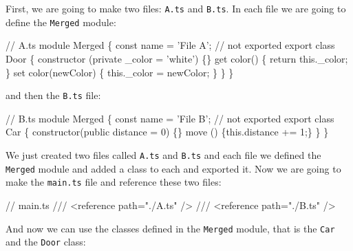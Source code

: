 \documentclass[12pt,]{article}
\newenvironment{Shaded}{}{}
\newcommand{\KeywordTok}[1]{\textcolor[rgb]{0.00,0.00,1.00}{{#1}}}
\newcommand{\DataTypeTok}[1]{{#1}}
\newcommand{\DecValTok}[1]{{#1}}
\newcommand{\CommentTok}[1]{\textcolor[rgb]{0.00,0.50,0.00}{{#1}}}
\newcommand{\FunctionTok}[1]{{#1}}
\newcommand{\NormalTok}[1]{{#1}}
\begin{document}
First, we are going to make two files: \texttt{A.ts} and \texttt{B.ts}.
In each file we are going to define the \texttt{Merged} module:

\begin{Shaded}
\begin{Highlighting}[numbers=left,,]
\CommentTok{// A.ts}
\NormalTok{module Merged \{}
  \DataTypeTok{const} \NormalTok{name = 'File A'; }\CommentTok{// not exported}
  \NormalTok{export }\KeywordTok{class} \NormalTok{Door \{}
    \FunctionTok{constructor} \NormalTok{(}\KeywordTok{private} \NormalTok{_color = 'white') \{\}}
    \NormalTok{get }\FunctionTok{color}\NormalTok{() \{ }\KeywordTok{return} \KeywordTok{this}\NormalTok{.}\FunctionTok{_color}\NormalTok{; \}}
    \NormalTok{set }\FunctionTok{color}\NormalTok{(newColor) \{ }\KeywordTok{this}\NormalTok{.}\FunctionTok{_color} \NormalTok{= newColor; \}}
  \NormalTok{\}}
\NormalTok{\}}
\end{Highlighting}
\end{Shaded}

and then the \texttt{B.ts} file:

\begin{Shaded}
\begin{Highlighting}[numbers=left,,]
\CommentTok{// B.ts}
\NormalTok{module Merged \{}
  \DataTypeTok{const} \NormalTok{name = 'File B'; }\CommentTok{// not exported}
  \NormalTok{export }\KeywordTok{class} \NormalTok{Car \{}
    \FunctionTok{constructor}\NormalTok{(}\KeywordTok{public} \NormalTok{distance = }\DecValTok{0}\NormalTok{) \{\}}
    \FunctionTok{move} \NormalTok{() \{}\KeywordTok{this}\NormalTok{.}\FunctionTok{distance} \NormalTok{+= }\DecValTok{1}\NormalTok{;\}}
  \NormalTok{\}}
\NormalTok{\}}
\end{Highlighting}
\end{Shaded}

We just created two files called \texttt{A.ts} and \texttt{B.ts} and
each file we defined the \texttt{Merged} module and added a class to
each and exported it. Now we are going to make the \texttt{main.ts} file
and reference these two files:

\begin{Shaded}
\begin{Highlighting}[numbers=left,,]
\CommentTok{// main.ts}
\CommentTok{/// <reference path="./A.ts" />}
\CommentTok{/// <reference path="./B.ts" />}
\end{Highlighting}
\end{Shaded}

And now we can use the classes defined in the \texttt{Merged} module,
that is the \texttt{Car} and the \texttt{Door} class:
\end{document}
